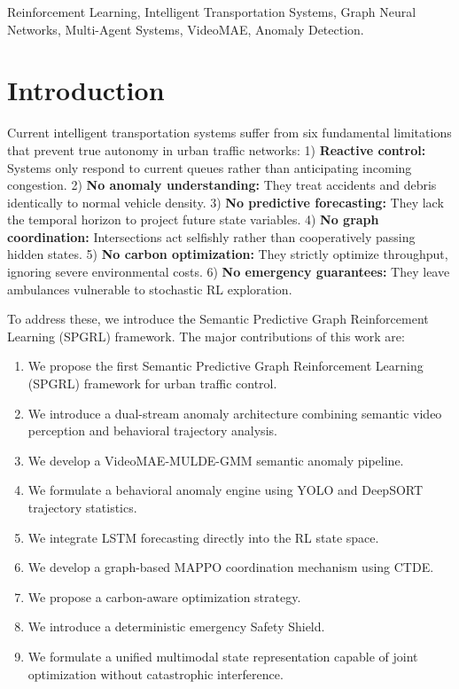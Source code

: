 \documentclass[journal]{IEEEtran}
\begin{document}
\begin{IEEEkeywords}
Reinforcement Learning, Intelligent Transportation Systems, Graph Neural Networks, Multi-Agent Systems, VideoMAE, Anomaly Detection.
\end{IEEEkeywords}




\section{Introduction}
\label{sec:introduction}
Current intelligent transportation systems suffer from six fundamental limitations that prevent true autonomy in urban traffic networks:
1) \textbf{Reactive control:} Systems only respond to current queues rather than anticipating incoming congestion.
2) \textbf{No anomaly understanding:} They treat accidents and debris identically to normal vehicle density.
3) \textbf{No predictive forecasting:} They lack the temporal horizon to project future state variables.
4) \textbf{No graph coordination:} Intersections act selfishly rather than cooperatively passing hidden states.
5) \textbf{No carbon optimization:} They strictly optimize throughput, ignoring severe environmental costs.
6) \textbf{No emergency guarantees:} They leave ambulances vulnerable to stochastic RL exploration.

To address these, we introduce the Semantic Predictive Graph Reinforcement Learning (SPGRL) framework. The major contributions of this work are:
\begin{enumerate}
    \item We propose the first Semantic Predictive Graph Reinforcement Learning (SPGRL) framework for urban traffic control.
    \item We introduce a dual-stream anomaly architecture combining semantic video perception and behavioral trajectory analysis.
    \item We develop a VideoMAE-MULDE-GMM semantic anomaly pipeline.
    \item We formulate a behavioral anomaly engine using YOLO and DeepSORT trajectory statistics.
    \item We integrate LSTM forecasting directly into the RL state space.
    \item We develop a graph-based MAPPO coordination mechanism using CTDE.
    \item We propose a carbon-aware optimization strategy.
    \item We introduce a deterministic emergency Safety Shield.
    \item We formulate a unified multimodal state representation capable of joint optimization without catastrophic interference.
\end{enumerate}
\end{document}
